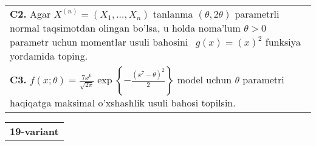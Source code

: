 \documentclass{article}
\begin{document}
\begin{tabular}{m{17cm}}
\\
\textbf{C2.} 
Agar \(X^{(n)} = \left( X_{1},...,X_{n} \right)\) tanlanma \((\theta,2\theta)\) parametrli normal taqsimotdan olingan bo'lsa, u holda noma'lum \(\theta > 0\) parametr uchun momentlar usuli bahosini \(\ \ g(x) = (x)^{2}\) funksiya yordamida toping.
\\
\textbf{C3.} 
\(f(x;\theta) = \frac{7x^{6}}{\sqrt{2\pi}}\exp\left\{ - \frac{(x^{7} - \theta)^{2}}{2} \right\}\) model uchun \(\theta\) parametri haqiqatga maksimal o'xshashlik usuli bahosi topilsin.
\\

\end{tabular}
\vspace{1cm}


\begin{tabular}{m{17cm}}
\textbf{19-variant}
\newline


\end{tabular}
\end{document}
